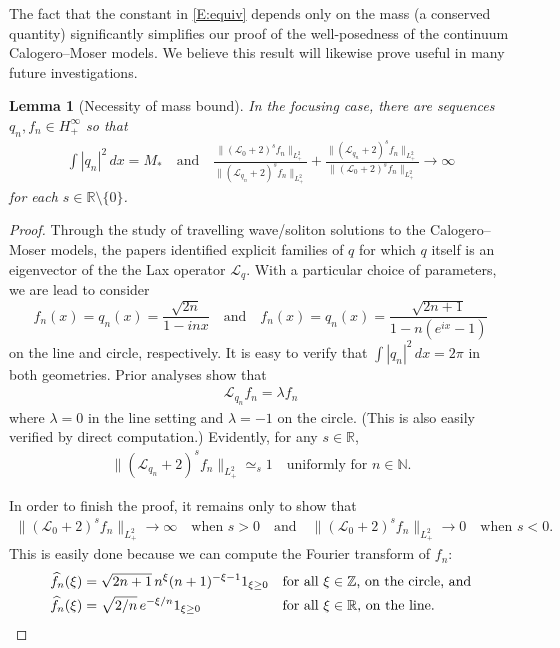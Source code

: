 \documentclass{amsart}
\numberwithin{equation}{section}
\newtheorem{lemma}[theorem]{Lemma}
\theoremstyle{definition}
\newcommand{\N}{\mathbb{N}}
\newcommand{\Z}{\mathbb{Z}}
\newcommand{\R}{\mathbb{R}}
\newcommand{\Lc}{\mathcal{L}}
\newcommand{\qtq}[1]{\quad\text{#1}\quad}
\begin{document}
The fact that the constant in \eqref{E:equiv} depends only on the mass (a conserved quantity) significantly simplifies our proof of the well-posedness of the continuum Calogero--Moser models. We believe this result will likewise prove useful in many future investigations.  


\begin{lemma}[Necessity of mass bound]\label{L:necessary}
In the focusing case, there are sequences $q_n, f_n \in H^\infty_+$ so that
\begin{align}
\int |q_n|^2 \,dx = M_\ast \qtq{and}
	\frac{ \|(\Lc_0+2)^{s}f_n \|_{L^2_+} }{ \|(\Lc_{q_n}+2)^{s}f_n \|_{L^2_+} }  +  \frac{ \|(\Lc_{q_n}+2)^{s}f_n \|_{L^2_+} }{ \|(\Lc_0+2)^{s}f_n \|_{L^2_+} }  
	\to \infty
\end{align}
for each $s\in\R\setminus\{0\}$.
\end{lemma}

\begin{proof}
Through the study of travelling wave/soliton solutions to the Calogero--Moser models, the papers \cite{gerard2024calogero,Rana2} identified explicit families of $q$ for which $q$ itself is an eigenvector of the the Lax operator $\Lc_q$.   With a particular choice of parameters, we are lead to consider
$$
f_n(x)=q_n(x) = \frac{\sqrt{2n}}{{1-inx}} \qtq{and} f_n(x)=q_n(x) = \frac{\sqrt{2n+1}}{1-n(e^{ix}-1)}
$$
on the line and circle, respectively.  It is easy to verify that $\int |q_n|^2\,dx = 2\pi$ in both geometries.   Prior analyses show that
\begin{align}
 \Lc_{q_n} f_n = \lambda f_n
\end{align}
where $\lambda=0$ in the line setting and $\lambda=-1$ on the circle.  (This is also easily verified by direct computation.)
Evidently, for any $s\in\R$,
\begin{align}
	\|(\Lc_{q_n}+2)^{s}f_n \|_{L^2_+} \simeq_s 1 \quad\text{uniformly for $n\in \N$}.  
\end{align}

In order to finish the proof, it remains only to show that 
\begin{align*}
	\|(\Lc_0+2)^{s}f_n \|_{L^2_+} \to\infty \qtq{when $s>0$} \text{and}\quad \|(\Lc_0+2)^{s}f_n \|_{L^2_+} \to 0 \quad\text{when $s<0$.}
\end{align*}
This is easily done because we can compute the Fourier transform of $f_n$:
\begin{align*}
	\widehat f_n(\xi) &= \sqrt{2n+1} \, n^\xi (n+1)^{-\xi-1} 1_{\xi\geq 0}   &&\text{for all $\xi\in\Z$, on the circle, and} \\
	\widehat f_n(\xi) &= \sqrt{2/n} \, e^{-\xi/n} 1_{\xi\geq 0}   &&\text{for all $\xi\in\R$, on the line.} \qedhere
\end{align*}
\end{proof}
\end{document}
